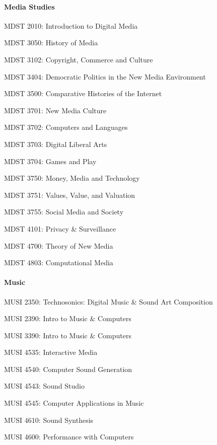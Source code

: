 \paragraph{Media Studies}
\begin{itemlist}
\item MDST 2010: Introduction to Digital Media
\item MDST 3050: History of Media
\item MDST 3102: Copyright, Commerce and Culture
\item MDST 3404: Democratic Politics in the New Media Environment
\item MDST 3500: Comparative Histories of the Internet
\item MDST 3701: New Media Culture
\item MDST 3702: Computers and Languages
\item MDST 3703: Digital Liberal Arts
\item MDST 3704: Games and Play
\item MDST 3750: Money, Media and Technology
\item MDST 3751: Values, Value, and Valuation
\item MDST 3755: Social Media and Society
\item MDST 4101: Privacy \& Surveillance
\item MDST 4700: Theory of New Media
\item MDST 4803: Computational Media
\end{itemlist}


\paragraph{Music}
\begin{itemlist}
\item MUSI 2350: Technosonics: Digital Music \& Sound Art Composition
\item MUSI 2390: Intro to Music \& Computers
\item MUSI 3390: Intro to Music \& Computers
\item MUSI 4535: Interactive Media
\item MUSI 4540: Computer Sound Generation
\item MUSI 4543: Sound Studio
\item MUSI 4545: Computer Applications in Music
\item MUSI 4610: Sound Synthesis
\item MUSI 4600: Performance with Computers
\end{itemlist}

